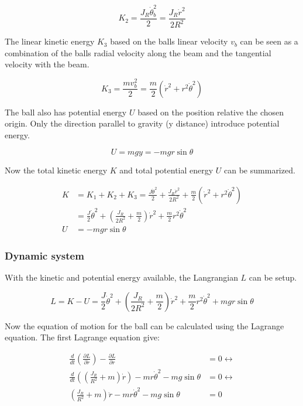 \documentclass[a4paper, titlepage]{article}
\begin{document}
\begin{equation}
K_2 = \frac{J_R\dot{\theta}_b^2}{2} = \frac{J_R\dot{r}^2}{2R^2}
\end{equation}

The linear kinetic energy $K_3$ based on the balls linear velocity $v_b$ can be seen as a combination of the balls radial velocity along the beam and the tangential velocity with the beam.

\begin{equation}
K_3 = \frac{mv_b^2}{2} = \frac{m}{2}(\dot{r}^2 + r^2\dot{\theta}^2)
\end{equation}

The ball also has potential energy $U$ based on the position relative the chosen origin.
Only the direction parallel to gravity (y distance) introduce potential energy.

\begin{equation}
U = mgy = -mgr\sin{\theta}
\end{equation}

Now the total kinetic energy $K$ and total potential energy $U$ can be summarized.

\begin{equation}
\begin{split}
K &= K_1 + K_2 + K_3 = 
\frac{J\dot{\theta}^2}{2} + 
\frac{J_R\dot{r}^2}{2R^2} + 
\frac{m}{2}(\dot{r}^2 + r^2\dot{\theta}^2) \\
&= \frac{J}{2}\dot{\theta}^2 + 
(\frac{J_R}{2R^2} + \frac{m}{2})\dot{r}^2 + 
\frac{m}{2}r^2\dot{\theta}^2 \\
U &= -mgr\sin{\theta}
\end{split}
\end{equation}

\subsubsection{Dynamic system}
With the kinetic and potential energy available, the Langrangian $L$ can be setup.

\begin{equation}
L = K - U = 
\frac{J}{2}\dot{\theta}^2 + 
(\frac{J_R}{2R^2} + \frac{m}{2})\dot{r}^2 + 
\frac{m}{2}r^2\dot{\theta}^2 +
mgr\sin{\theta}
\end{equation}

Now the equation of motion for the ball can be calculated using the Lagrange equation.
The first Lagrange equation give:

\begin{equation}
\begin{split}
\frac{d}{dt}\left(\frac{\partial L}{\partial \dot{r}}\right) - \frac{\partial L}{\partial r} &= 0 \leftrightarrow \\
\frac{d}{dt}\left(\left(\frac{J_R}{R^2} + m\right)\dot{r}\right) - mr\dot{\theta}^2 - mg\sin{\theta} &= 0 \leftrightarrow \\
\left(\frac{J_R}{R^2} + m\right)\ddot{r} - mr\dot{\theta}^2 - mg\sin{\theta} &= 0
\label{equ:ballDiff}
\end{split}
\end{equation}
\end{document}
